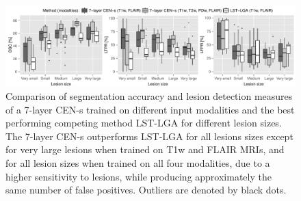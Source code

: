
\begin{figure}
\centering
\includegraphics[width=\textwidth]{figures/cen_vs_LGA_size}

\caption{Comparison of segmentation accuracy and lesion detection measures of a
7-layer CEN-s trained on different input modalities and the best performing
competing method LST-LGA for different lesion sizes. The 7-layer CEN-s
outperforms LST-LGA for all lesions sizes except for very large lesions when
trained on T1w and FLAIR MRIs, and for all lesion sizes when trained on all four
modalities, due to a higher sensitivity to lesions, while producing
approximately the same number of false positives. Outliers are denoted by black
dots.}

\label{fig:sizecomp}
\end{figure}


